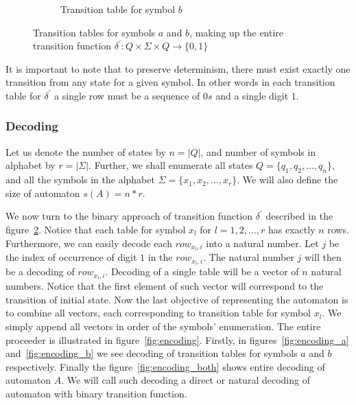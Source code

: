 \documentclass[runningheads, a4paper]{llncs}
\begin{document}
\begin{figure}
\begin{center}
\begin{subfigure}{.5\textwidth}
\begin{tabular}{|P{1.0cm} || P{0.8cm} | P{0.8cm} | P{0.8cm} | P{0.8cm}|}
	\end{tabular}
	
	\caption{Transition table for symbol $b$}
	\label{fig:ttable_bin_b}
	
	\end{subfigure}%

	
\caption{Transition tables for symbols $a$ and $b$, making up the entire transition function $\delta^{'}: Q \times \Sigma \times Q \rightarrow \{0,1\}$}

\label{fig:ttable_bin}
\end{center}
\end{figure}

It is important to note that to preserve determinism, there must exist exactly one transition from any state for a given symbol. In other words in each transition table for $\delta^{'}$ a single row must be a sequence of $0s$ and a single digit $1$.

\subsubsection{Decoding} \label{sec:auto_dec}

Let us denote the number of states by $n = |Q|$, and number of symbols in alphabet by $r = |\Sigma|$. Further, we shall enumerate all states 	$Q = \{q_1, q_2, \ldots, q_n\}$, and all the symbols in the alphabet 	$\Sigma = \{x_1, x_2, \ldots, x_r\}$. We will also define the size of automaton $s(A) = n*r$.

We now turn to the binary approach of transition function $\delta^{'}$ described in the figure~\ref{fig:ttable_bin}. Notice that each table for symbol $x_l$ for $l = 1,2, \dots, r$ has exactly $n$ rows. Furthermore, we can easily decode each $row_{x_l, i}$ into a natural number. Let $j$ be the index of occurrence of digit $1$ in the $row_{x_l, i}$. The natural number $j$ will then be a decoding of $row_{x_l, i}$. Decoding of a single table will be a vector of $n$ natural numbers. Notice that the first element of such vector will correspond to the transition of initial state. Now the last objective of representing the automaton is to combine all vectors, each corresponding to transition table for symbol $x_{l}$. We simply append all vectors in order of the symbols' enumeration. The entire proceeder is illustrated in figure~\ref{fig:encoding}. Firstly, in figures~\ref{fig:encoding_a} and~\ref{fig:encoding_b} we see decoding of transition tables for symbols $a$ and $b$ respectively. Finally the figure~\ref{fig:encoding_both} shows entire decoding of automaton $A$. We will call such decoding a direct or natural decoding of automaton with binary transition function.
\end{document}
